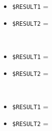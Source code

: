 \documentclass[../../SperimentazioniPratiche.tex]{subfiles}
\begin{document}
\begin{tcolorbox}[fonttitle=\bfseries, 
								adjusted title={\Large Prova 1D.1}, 
								breakable, 
								sharp corners=south,
								colback=white, 
								colframe=white!60!black]
\begin{description}
					\tcbline				
        				
        			\item[Output riscontrato] \ \par
        				\begin{description}
        				
        					\item[\dispositivoA] \ \par
        					\begin{itemize}
        						\item \verb|$RESULT1| = \ok
        						\item \verb|$RESULT2| = \ok
        					\end{itemize}      					
        					
        					\item[\dispositivoB] \ \par
        					\begin{itemize}
        						\item \verb|$RESULT1| = \ok
        						\item \verb|$RESULT2| = \ok
        					\end{itemize}
        					
        					\item[\dispositivoC] \ \par
        					\begin{itemize}
        						\item \verb|$RESULT1| = \ok
        						\item \verb|$RESULT2| = \ok
        					\end{itemize}
        					
        				\end{description}
        				
				\end{description}  
				
			\end{tcolorbox}

	
	\newpage
\end{document}
